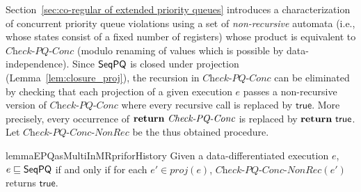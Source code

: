 Section~\ref{sec:co-regular of extended priority queues} introduces a characterization of concurrent priority queue violations using a set of \emph{non-recursive} automata (i.e., whose states consist of a fixed number of registers) whose product is equivalent to $\textit{Check-PQ-Conc}$ (modulo renaming of values which is possible by data-independence). Since $\mathsf{SeqPQ}$ is closed under projection (Lemma~\ref{lem:closure_proj}), the recursion in $\textit{Check-PQ-Conc}$ can be eliminated by checking that each projection of a given execution $e$ passes a non-recursive version of $\textit{Check-PQ-Conc}$ where every recursive call is replaced by $\mathsf{true}$. More precisely, every occurrence of $\text{{\bf return}}\ \textit{Check-PQ-Conc}$ is replaced by  $\text{{\bf return}}\ \mathsf{true}$. Let $\textit{Check-PQ-Conc-NonRec}$ be the thus obtained procedure.

\begin{restatable}{lemma}{EPQasMultiInMRpriforHistory}
\label{lemma:EPQ as multi in MRpri for history}
Given a data-differentiated execution $e$, $e \sqsubseteq \mathsf{SeqPQ}$ if and only if for each $e' \in \textit{proj}(e)$, $\textit{Check-PQ-Conc-NonRec}(e')$ returns $\mathsf{true}$.
\end{restatable}






